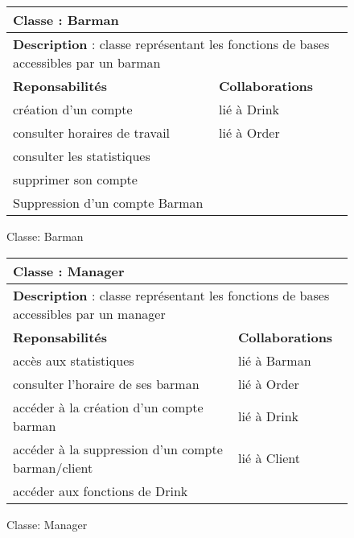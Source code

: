 \documentclass{article}
\begin{document}
\begin{figure}
\begin{tabular}{|p{7cm}|p{7cm}|}
\hline
 \multicolumn{2}{|p{12cm}|}{\textbf{Classe} : Barman }
   \\
 \hline
  \multicolumn{2}{|p{12cm}|}{ \textbf{Description} :  classe représentant les fonctions de bases accessibles par un barman}
\\
 \hline
 \textbf{Reponsabilités} & \textbf{Collaborations} \\
 \hline
 création d'un compte & lié à Drink \\
 consulter horaires de travail & lié à Order \\
 consulter les statistiques & \\
 supprimer son compte & \\
 Suppression d'un compte Barman & \\
  \hline
\end{tabular}
\caption{Classe: Barman}
\label{tab:serveur}
\end{figure}


\begin{figure}
\begin{tabular}{|p{7cm}|p{7cm}|}
\hline
 \multicolumn{2}{|p{12cm}|}{\textbf{Classe} : Manager }
   \\
 \hline
  \multicolumn{2}{|p{12cm}|}{ \textbf{Description} :  classe représentant les fonctions de bases accessibles par un manager}
\\
 \hline
 \textbf{Reponsabilités} & \textbf{Collaborations} \\
 \hline
accès aux statistiques & lié à Barman\\
consulter l'horaire de ses barman & lié à Order \\
accéder à la création d'un compte barman & lié à Drink \\
accéder à la suppression d'un compte barman/client & lié à Client\\
accéder aux fonctions de Drink & \\

  \hline
\end{tabular}
\caption{Classe: Manager}
\label{tab:manager}
\end{figure}
\end{document}
